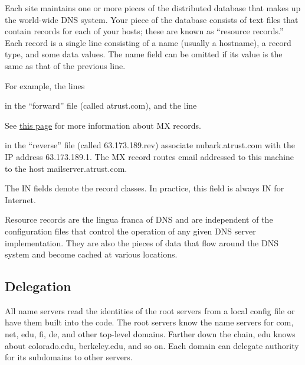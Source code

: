Each site maintains one or more pieces of the distributed database that
makes up the world-wide DNS system. Your piece of the database consists
of text files that contain records for each of your hosts; these are
known as ``resource records.'' Each record is a single line consisting
of a name (usually a hostname), a record type, and some data values. The
name field can be omitted if its value is the same as that of the
previous line.

For example, the lines


in the ``forward'' file (called {atrust.com}), and the line


\leavevmode\hypertarget{part0024_split_014.htmlux5cux23_idContainer917}{}%
See
\protect\hyperlink{part0024_split_027.htmlux5cux23_idTextAnchor882}{this
page} for more information about MX records.

in the
``\protect\hypertarget{part0024_split_014.htmlux5cux23_idIndexMarker2034}{}{}reverse''
file (called {63.173.189.rev}) associate nubark.atrust.com with the IP
address 63.173.189.1. The MX record routes email addressed to this
machine to the host mailserver.atrust.com.

The IN fields denote the record classes. In practice, this field is
always IN for Internet.

Resource records are the lingua franca of DNS and are independent of the
configuration files that control the operation of any given DNS server
implementation. They are also the pieces of data that flow around the
DNS system and become cached at various locations.

\protect\hypertarget{part0024_split_015.html}{}{}

\hypertarget{part0024_split_015.htmlux5cux23_idContainer1069}{}
\hypertarget{part0024_split_015.htmlux5cux23calibre_pb_14}{%
\subsection[Delegation]{\texorpdfstring{\protect\hypertarget{part0024_split_015.htmlux5cux23_idTextAnchor859}{}{}Delegation}{Delegation}}\label{part0024_split_015.htmlux5cux23calibre_pb_14}}

\protect\hypertarget{part0024_split_015.htmlux5cux23_idIndexMarker2035}{}{}All
name servers read the identities of
the\protect\hypertarget{part0024_split_015.htmlux5cux23_idIndexMarker2036}{}{}\protect\hypertarget{part0024_split_015.htmlux5cux23_idIndexMarker2037}{}{}
root servers from a local config file or have them built into the code.
The root servers know the name servers for com, net, edu, fi, de, and
other top-level domains. Farther down the chain, edu knows about
colorado.edu, berkeley.edu, and so on. Each domain can delegate
authority for its subdomains to other servers.

